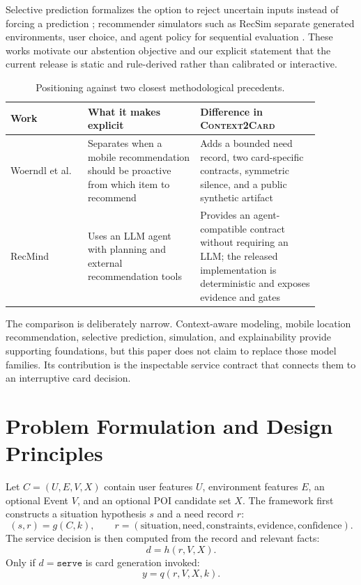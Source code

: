 \documentclass[10pt]{article}
\newcommand{\method}{\textsc{Context2Card}}
\newcommand{\serve}{\texttt{serve}}
\begin{document}
Selective prediction formalizes the option to reject uncertain inputs instead of forcing a prediction \citep{geifman2019selectivenet}; recommender simulators such as RecSim separate generated environments, user choice, and agent policy for sequential evaluation \citep{ie2019recsim}. These works motivate our abstention objective and our explicit statement that the current release is static and rule-derived rather than calibrated or interactive.

\begin{table}[t]
\centering
\small
\caption{Positioning against two closest methodological precedents.}
\label{tab:related-positioning}
\begin{tabular}{P{0.22\linewidth}P{0.32\linewidth}P{0.34\linewidth}}
\toprule
Work & What it makes explicit & Difference in \method{} \\
\midrule
Woerndl et al.~\citep{woerndl2011proactivity} & Separates when a mobile recommendation should be proactive from which item to recommend & Adds a bounded need record, two card-specific contracts, symmetric silence, and a public synthetic artifact \\
RecMind~\citep{wang2024recmind} & Uses an LLM agent with planning and external recommendation tools & Provides an agent-compatible contract without requiring an LLM; the released implementation is deterministic and exposes evidence and gates \\
\bottomrule
\end{tabular}
\end{table}

The comparison is deliberately narrow. Context-aware modeling, mobile location recommendation, selective prediction, simulation, and explainability provide supporting foundations, but this paper does not claim to replace those model families. Its contribution is the inspectable service contract that connects them to an interruptive card decision.

\section{Problem Formulation and Design Principles}

Let $C=(U,E,V,X)$ contain user features $U$, environment features $E$, an optional Event $V$, and an optional POI candidate set $X$. The framework first constructs a situation hypothesis $s$ and a need record $r$:
\begin{equation}
  (s,r)=g(C,k), \qquad
  r=(\text{situation},\text{need},\text{constraints},\text{evidence},\text{confidence}).
\end{equation}
The service decision is then computed from the record and relevant facts:
\begin{equation}
  d=h(r,V,X).
\end{equation}
Only if $d=\serve$ is card generation invoked:
\begin{equation}
  y=q(r,V,X,k).
\end{equation}
\end{document}

